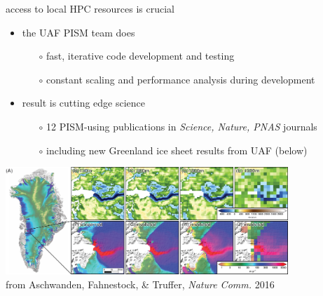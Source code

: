 \documentclass[hide notes,intlimits]{beamer}
\begin{document}
\begin{frame}{access to local HPC resources is crucial}

    \begin{itemize}
    \item the UAF PISM team does
       \begin{itemize}
       \item[$\circ$] fast, iterative code development and testing
       \item[$\circ$] constant scaling and performance analysis during development
       \end{itemize}    
    \item result is cutting edge science
       \begin{itemize}
       \item[$\circ$] 12 PISM-using publications in \emph{Science, Nature, PNAS} journals
       \item[$\circ$] including new Greenland ice sheet results from UAF (below)
       \end{itemize}
    \end{itemize}

\begin{center}
    \includegraphics[width=0.8\textwidth]{jakobshavn-beds}
    \\ \hfill \scriptsize from Aschwanden, Fahnestock, \& Truffer, \emph{Nature Comm.} 2016
\end{center}
\end{frame}



\end{document}
